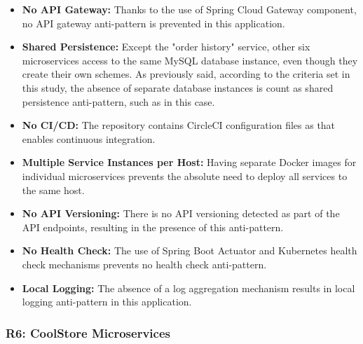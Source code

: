 \documentclass{Configuration_Files/PoliMi3i_thesis}
\begin{document}
\begin{itemize}
    \item \textbf{No API Gateway:} Thanks to the use of Spring Cloud Gateway component, no API gateway anti-pattern is prevented in this application.
    
    \item \textbf{Shared Persistence:} Except the "order history" service, other six microservices access to the same MySQL database instance, even though they create their own schemes.
    As previously said, according to the criteria set in this study, the absence of separate database instances is count as shared persistence anti-pattern, such as in this case.
    
    \item \textbf{No CI/CD:} The repository contains CircleCI\footnotemark[94] configuration files as that enables continuous integration.
    
    \item \textbf{Multiple Service Instances per Host:} Having separate Docker images for individual microservices prevents the absolute need to deploy all services to the same host.
    
    \item \textbf{No API Versioning:} There is no API versioning detected as part of the API endpoints, resulting in the presence of this anti-pattern.
    
    \item \textbf{No Health Check:} The use of Spring Boot Actuator and Kubernetes health check mechanisms prevents no health check anti-pattern.
    
    \item \textbf{Local Logging:} The absence of a log aggregation mechanism results in local logging anti-pattern in this application.
\end{itemize}

\subsubsection{R6: CoolStore Microservices}
\label{subsubsec:R6}
\end{document}
